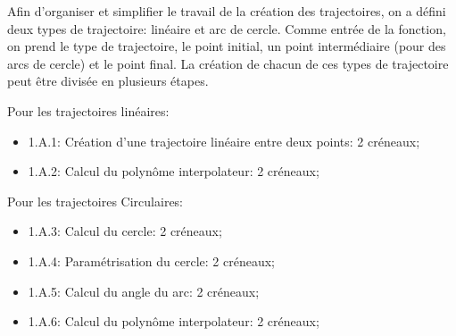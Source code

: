 \label{sec:Traj}
Afin d'organiser et simplifier le travail de la création des trajectoires, on a défini deux types de trajectoire: linéaire et arc de cercle. Comme entrée de la fonction, on prend le type de trajectoire, le point initial, un point intermédiaire (pour des arcs de cercle) et le point final. La création de chacun de ces types de trajectoire peut être divisée en plusieurs étapes. 

Pour les trajectoires linéaires: 

\begin{itemize}
	\item 1.A.1: Création d'une trajectoire linéaire entre deux points: 2 créneaux;
	 \item  1.A.2: Calcul du polynôme interpolateur: 2 créneaux; 
\end{itemize}

Pour les trajectoires Circulaires:

\begin{itemize}
	\item 1.A.3: Calcul du cercle: 2 créneaux;
	\item  1.A.4: Paramétrisation du cercle: 2 créneaux;
	 \item 1.A.5: Calcul du angle du arc: 2 créneaux;
	 \item 1.A.6: Calcul du polynôme interpolateur: 2 créneaux; 
\end{itemize}

